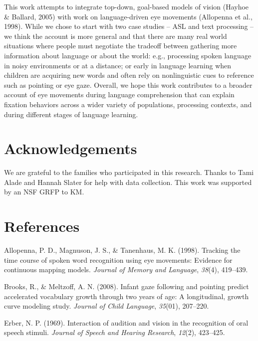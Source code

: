 \documentclass[10pt, letterpaper]{article}
\begin{document}
This work attempts to integrate top-down, goal-based models of vision
(Hayhoe \& Ballard, 2005) with work on language-driven eye movements
(Allopenna et al., 1998). While we chose to start with two case studies
-- ASL and text processing -- we think the account is more general and
that there are many real world situations where people must negotiate
the tradeoff between gathering more information about language or about
the world: e.g., processing spoken language in noisy environments or at
a distance; or early in language learning when children are acquiring
new words and often rely on nonlinguistic cues to reference such as
pointing or eye gaze. Overall, we hope this work contributes to a
broader account of eye movements during language comprehension that can
explain fixation behaviors across a wider variety of populations,
processing contexts, and during different stages of language learning.

\section{Acknowledgements}\label{acknowledgements}

We are grateful to the families who participated in this research.
Thanks to Tami Alade and Hannah Slater for help with data collection.
This work was supported by an NSF GRFP to KM.

\section{References}\label{references}

\setlength{\parindent}{-0.1in} \setlength{\leftskip}{0.125in} \noindent

\hypertarget{refs}{}
\hypertarget{ref-allopenna1998tracking}{}
Allopenna, P. D., Magnuson, J. S., \& Tanenhaus, M. K. (1998). Tracking
the time course of spoken word recognition using eye movements: Evidence
for continuous mapping models. \emph{Journal of Memory and Language},
\emph{38}(4), 419--439.

\hypertarget{ref-brooks2008infant}{}
Brooks, R., \& Meltzoff, A. N. (2008). Infant gaze following and
pointing predict accelerated vocabulary growth through two years of age:
A longitudinal, growth curve modeling study. \emph{Journal of Child
Language}, \emph{35}(01), 207--220.

\hypertarget{ref-erber1969interaction}{}
Erber, N. P. (1969). Interaction of audition and vision in the
recognition of oral speech stimuli. \emph{Journal of Speech and Hearing
Research}, \emph{12}(2), 423--425.
\end{document}
